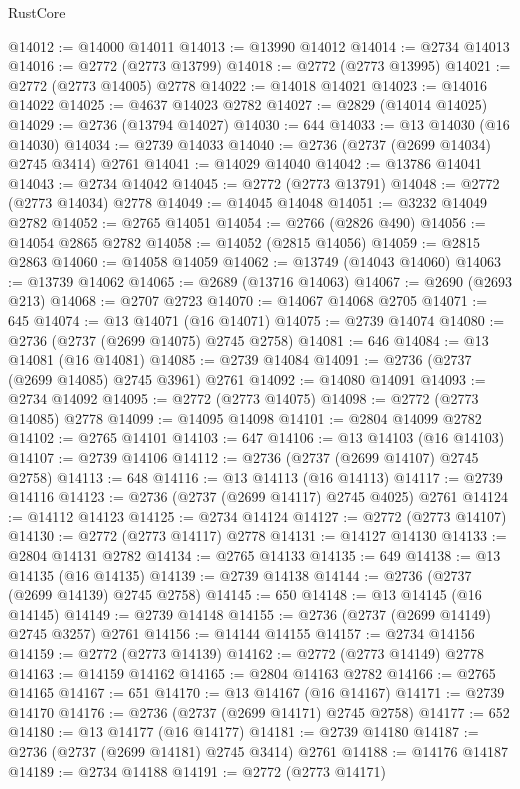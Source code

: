 \begin{lexlean}{RustCore}
\begin{coremodule}
@14012 := @14000 @14011
@14013 := @13990 @14012
@14014 := @2734 @14013
@14016 := @2772 (@2773 @13799)
@14018 := @2772 (@2773 @13995)
@14021 := @2772 (@2773 @14005) @2778
@14022 := @14018 @14021
@14023 := @14016 @14022
@14025 := @4637 @14023 @2782
@14027 := @2829 (@14014 @14025)
@14029 := @2736 (@13794 @14027)
@14030 := 644
@14033 := @13 @14030 (@16 @14030)
@14034 := @2739 @14033
@14040 := @2736 (@2737 (@2699 @14034) @2745 @3414) @2761
@14041 := @14029 @14040
@14042 := @13786 @14041
@14043 := @2734 @14042
@14045 := @2772 (@2773 @13791)
@14048 := @2772 (@2773 @14034) @2778
@14049 := @14045 @14048
@14051 := @3232 @14049 @2782
@14052 := @2765 @14051
@14054 := @2766 (@2826 @490)
@14056 := @14054 @2865 @2782
@14058 := @14052 (@2815 @14056)
@14059 := @2815 @2863
@14060 := @14058 @14059
@14062 := @13749 (@14043 @14060)
@14063 := @13739 @14062
@14065 := @2689 (@13716 @14063)
@14067 := @2690 (@2693 @213)
@14068 := @2707 @2723
@14070 := @14067 @14068 @2705
@14071 := 645
@14074 := @13 @14071 (@16 @14071)
@14075 := @2739 @14074
@14080 := @2736 (@2737 (@2699 @14075) @2745 @2758)
@14081 := 646
@14084 := @13 @14081 (@16 @14081)
@14085 := @2739 @14084
@14091 := @2736 (@2737 (@2699 @14085) @2745 @3961) @2761
@14092 := @14080 @14091
@14093 := @2734 @14092
@14095 := @2772 (@2773 @14075)
@14098 := @2772 (@2773 @14085) @2778
@14099 := @14095 @14098
@14101 := @2804 @14099 @2782
@14102 := @2765 @14101
@14103 := 647
@14106 := @13 @14103 (@16 @14103)
@14107 := @2739 @14106
@14112 := @2736 (@2737 (@2699 @14107) @2745 @2758)
@14113 := 648
@14116 := @13 @14113 (@16 @14113)
@14117 := @2739 @14116
@14123 := @2736 (@2737 (@2699 @14117) @2745 @4025) @2761
@14124 := @14112 @14123
@14125 := @2734 @14124
@14127 := @2772 (@2773 @14107)
@14130 := @2772 (@2773 @14117) @2778
@14131 := @14127 @14130
@14133 := @2804 @14131 @2782
@14134 := @2765 @14133
@14135 := 649
@14138 := @13 @14135 (@16 @14135)
@14139 := @2739 @14138
@14144 := @2736 (@2737 (@2699 @14139) @2745 @2758)
@14145 := 650
@14148 := @13 @14145 (@16 @14145)
@14149 := @2739 @14148
@14155 := @2736 (@2737 (@2699 @14149) @2745 @3257) @2761
@14156 := @14144 @14155
@14157 := @2734 @14156
@14159 := @2772 (@2773 @14139)
@14162 := @2772 (@2773 @14149) @2778
@14163 := @14159 @14162
@14165 := @2804 @14163 @2782
@14166 := @2765 @14165
@14167 := 651
@14170 := @13 @14167 (@16 @14167)
@14171 := @2739 @14170
@14176 := @2736 (@2737 (@2699 @14171) @2745 @2758)
@14177 := 652
@14180 := @13 @14177 (@16 @14177)
@14181 := @2739 @14180
@14187 := @2736 (@2737 (@2699 @14181) @2745 @3414) @2761
@14188 := @14176 @14187
@14189 := @2734 @14188
@14191 := @2772 (@2773 @14171)

\end{coremodule}
\end{lexlean}
